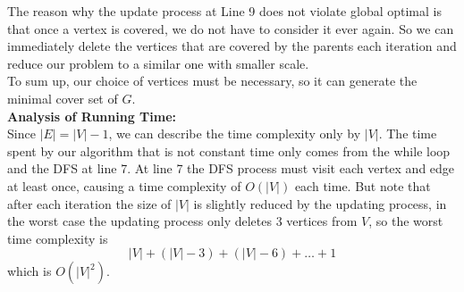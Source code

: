 \documentclass[12pt,letterpaper]{article}
\begin{document}
The reason why the update process at Line 9 does not violate global optimal is that
once a vertex is covered, 
we do not have to consider it ever again.
So we can immediately delete the vertices that are covered by the parents each iteration
and reduce our problem to a similar one with smaller scale.\\
To sum up, our choice of vertices must be necessary,
so it can generate the minimal cover set of $G$.\\
\textbf{Analysis of Running Time:}\\
Since $|E|=|V|-1$, we can describe the time complexity only by $|V|$.
The time spent by our algorithm that is not constant time only comes from the while loop and the DFS at line 7.
At line 7 the DFS process must visit each vertex and edge at least once,
causing a time complexity of $O(|V|)$ each time.
But note that after each iteration the size of $|V|$ is slightly reduced by the updating process,
in the worst case the updating process only deletes 3 vertices from $V$,
so the worst time complexity is 
$$|V|+(|V|-3)+(|V|-6)+\dots+1$$
which is $O(|V|^2)$.
\end{document}

